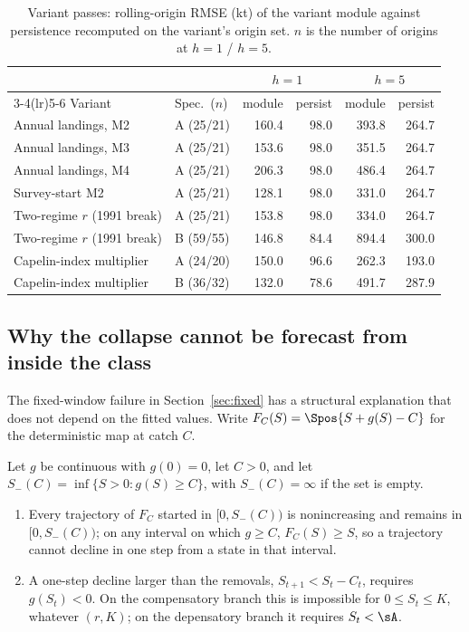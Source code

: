 \begin{table}[!htb]
\centering\small
\caption{Variant passes: rolling-origin RMSE (kt) of the variant module against persistence recomputed on the variant's origin set. $n$ is the number of origins at $h=1$ / $h=5$.}
\label{tab:variants}
\begin{tabular}{@{}llrrrr@{}}
\toprule
 & & \multicolumn{2}{c}{$h=1$} & \multicolumn{2}{c}{$h=5$} \\
\cmidrule(lr){3-4}\cmidrule(lr){5-6}
Variant & Spec.\ ($n$) & module & persist & module & persist \\
\midrule
Annual landings, M2 & A (25/21) & 160.4 & 98.0 & 393.8 & 264.7 \\
Annual landings, M3 & A (25/21) & 153.6 & 98.0 & 351.5 & 264.7 \\
Annual landings, M4 & A (25/21) & 206.3 & 98.0 & 486.4 & 264.7 \\
Survey-start M2 & A (25/21) & 128.1 & 98.0 & 331.0 & 264.7 \\
Two-regime $r$ (1991 break) & A (25/21) & 153.8 & 98.0 & 334.0 & 264.7 \\
Two-regime $r$ (1991 break) & B (59/55) & 146.8 & 84.4 & 894.4 & 300.0 \\
Capelin-index multiplier & A (24/20) & 150.0 & 96.6 & 262.3 & 193.0 \\
Capelin-index multiplier & B (36/32) & 132.0 & 78.6 & 491.7 & 287.9 \\
\bottomrule
\end{tabular}
\end{table}

\FloatBarrier
\subsection{Why the collapse cannot be forecast from inside the class}\label{sec:identification}

The fixed-window failure in Section~\ref{sec:fixed} has a structural explanation that does not depend on the fitted values. Write $F_C(S) = \Spos{S + g(S) - C}$ for the deterministic map at catch $C$.

\begin{proposition}\label{prop:repeller}
Let $g$ be continuous with $g(0)=0$, let $C>0$, and let $S_-(C) = \inf\{S>0 : g(S)\ge C\}$, with $S_-(C)=\infty$ if the set is empty.
\begin{enumerate}[label=(\roman*),leftmargin=2.2em,itemsep=1pt]
\item Every trajectory of $F_C$ started in $[0,S_-(C))$ is nonincreasing and remains in $[0,S_-(C))$; on any interval on which $g \ge C$, $F_C(S)\ge S$, so a trajectory cannot decline in one step from a state in that interval.
\item A one-step decline larger than the removals, $S_{t+1} < S_t - C_t$, requires $g(S_t) < 0$. On the compensatory branch this is impossible for $0\le S_t\le K$, whatever $(r,K)$; on the depensatory branch it requires $S_t < \sA$.
\end{enumerate}
\end{proposition}

